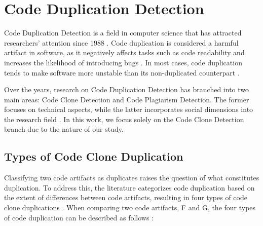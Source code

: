 \en

\section{Code Duplication Detection}

Code Duplication Detection is a field in computer science that has attracted
researchers' attention since 1988 \citep{firstman}. Code
duplication is considered a harmful artifact in software, as it negatively
affects tasks such as code readability and increases the likelihood of
introducing bugs \citep{harmone}. In most cases, code duplication tends to make
software more unstable than its non-duplicated counterpart
\citep{harmtwo}.

Over the years, research on Code Duplication Detection has branched into two
main areas: Code Clone Detection and Code Plagiarism Detection. The former
focuses on technical aspects, while the latter incorporates social dimensions
into the research field \citep{litreview}. In this work, we focus solely on the
Code Clone Detection branch due to the nature of our study.

\subsection{Types of Code Clone Duplication}

\label{subsec:types}

Classifying two code artifacts as duplicates raises the question of
what constitutes duplication. To address this, the literature categorizes code
duplication based on the extent of differences between code artifacts,
resulting in four types of code clone duplications \citep{litreview}. When
comparing two code artifacts, F and G, the four types of code duplication can
be described as follows \citep{litreview}:


